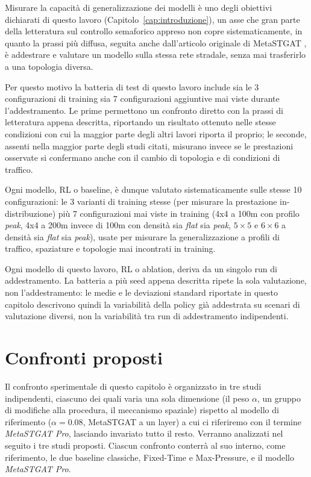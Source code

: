 Misurare la capacità di generalizzazione dei modelli è uno degli obiettivi
dichiarati di questo lavoro (Capitolo~\ref{cap:introduzione}), un asse che
gran parte della letteratura sul controllo semaforico appreso non copre
sistematicamente, in quanto la prassi più diffusa, seguita anche dall'articolo
originale di MetaSTGAT \citep{wang2022metastgat}, è addestrare e valutare un modello sulla stessa
rete stradale, senza mai trasferirlo a una topologia diversa.

Per questo motivo la batteria di test di questo lavoro include sia le 3
configurazioni di training sia 7 configurazioni aggiuntive mai viste
durante l'addestramento. Le prime permettono un confronto diretto con la
prassi di letteratura appena descritta, riportando un risultato ottenuto
nelle stesse condizioni con cui la maggior parte degli altri lavori
riporta il proprio; le seconde, assenti nella maggior parte degli studi
citati, misurano invece se le prestazioni osservate si confermano anche con il cambio
di topologia e di condizioni di traffico.

Ogni modello, RL o baseline, è dunque valutato sistematicamente sulle
stesse 10 configurazioni: le 3 varianti di training stesse (per misurare la
prestazione in-distribuzione) più 7 configurazioni mai viste in training
(4x4 a 100m con profilo \emph{peak}, 4x4 a 200m invece di 100m con densità sia
\emph{flat} sia \emph{peak}, $5\times5$ e $6\times6$ a densità sia
\emph{flat} sia \emph{peak}), usate per misurare la generalizzazione a
profili di traffico, spaziature e topologie mai incontrati in training.

Ogni modello di questo lavoro, RL o ablation, deriva da un singolo run di
addestramento. La batteria a più seed appena descritta ripete la sola
valutazione, non l'addestramento: le medie e le deviazioni standard
riportate in questo capitolo descrivono quindi la variabilità della
policy già addestrata su scenari di valutazione diversi, non la
variabilità tra run di addestramento indipendenti.

\section{Confronti proposti}
\label{sec:confronti}

Il confronto sperimentale di questo capitolo è organizzato in tre studi indipendenti,
ciascuno dei quali varia una sola dimensione (il peso $\alpha$, un gruppo di
modifiche alla procedura, il meccanismo spaziale) rispetto al
modello di riferimento ($\alpha=0.08$, MetaSTGAT a un layer) a cui ci riferiremo con il termine \emph{MetaSTGAT Pro},
lasciando invariato tutto il resto. Verranno analizzati nel seguito i tre studi proposti.
Ciascun confronto conterrà al suo interno, come riferimento, le due baseline classiche, Fixed-Time e Max-Pressure, e il modello \emph{MetaSTGAT Pro}.

